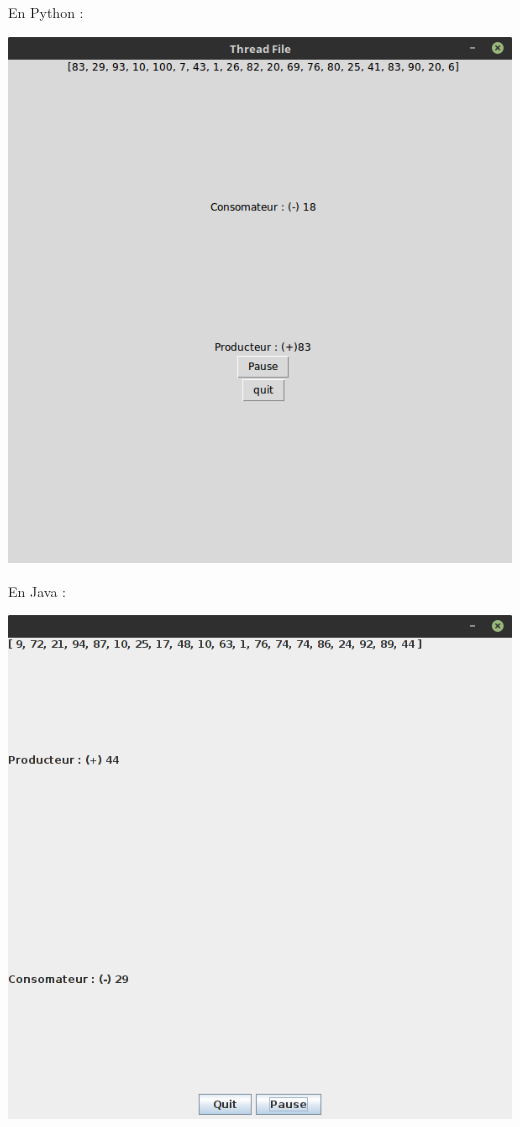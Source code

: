 \documentclass{article}
\begin{document}
En Python :
\begin{center}
  \includegraphics[scale=0.6]{Prgmpy.png}
\end{center}
En Java : 
\begin{center}
  \includegraphics[scale=0.6]{Prgmjava.png}
\end{center}





\end{document}
